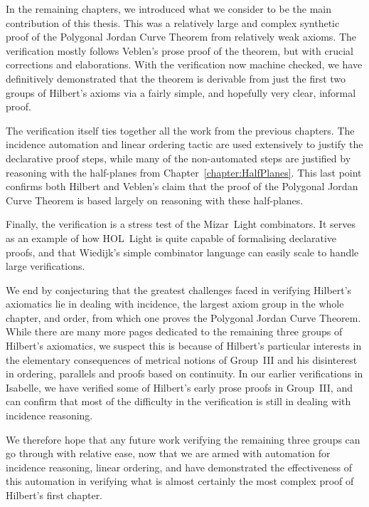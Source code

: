 In the remaining chapters, we introduced what we consider to be the main contribution of this thesis. This was a relatively large and complex synthetic proof of the Polygonal Jordan Curve Theorem from relatively weak axioms. The verification mostly follows Veblen's prose proof of the theorem, but with crucial corrections and elaborations. With the verification now machine checked, we have definitively demonstrated that the theorem is derivable from just the first two groups of Hilbert's axioms via a fairly simple, and hopefully very clear, informal proof.

The verification itself ties together all the work from the previous chapters. The incidence automation and linear ordering tactic are used extensively to justify the declarative proof steps, while many of the non-automated steps are justified by reasoning with the half-planes from Chapter~\ref{chapter:HalfPlanes}. This last point confirms both Hilbert and Veblen's claim that the proof of the Polygonal Jordan Curve Theorem is based largely on reasoning with these half-planes.

Finally, the verification is a stress test of the Mizar~Light combinators. It serves as an example of how HOL~Light is quite capable of formalising declarative proofs, and that Wiedijk's simple combinator language can easily scale to handle large verifications.

We end by conjecturing that the greatest challenges faced in verifying Hilbert's axiomatics lie in dealing with incidence, the largest axiom group in the whole chapter, and order, from which one proves the Polygonal Jordan Curve Theorem. While there are many more pages dedicated to the remaining three groups of Hilbert's axiomatics, we suspect this is because of Hilbert's particular interests in the elementary consequences of metrical notions of Group~III and his disinterest in ordering, parallels and proofs based on continuity. In our earlier verifications in Isabelle, we have verified some of Hilbert's early prose proofs in Group~III, and can confirm that most of the difficulty in the verification is still in dealing with incidence reasoning.

We therefore hope that any future work verifying the remaining three groups can go through with relative ease, now that we are armed with automation for incidence reasoning, linear ordering, and have demonstrated the effectiveness of this automation in verifying what is almost certainly the most complex proof of Hilbert's first chapter.
